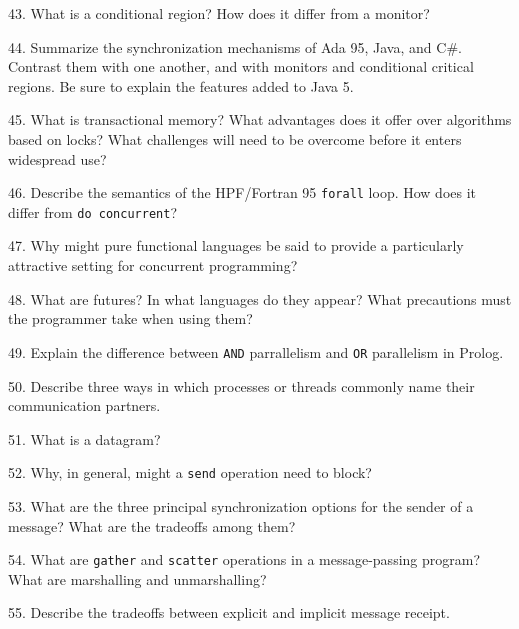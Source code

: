 43. What is a conditional region? How does it differ from a monitor?

\filbreak
\vskip 1cm

44. Summarize the synchronization mechanisms of Ada 95, Java, and C$\#$. Contrast them with one another, and with monitors and conditional critical regions. Be sure to explain the features added to Java 5.

\filbreak
\vskip 1cm

45. What is transactional memory? What advantages does it offer over algorithms based on locks? What challenges will need to be overcome before it enters widespread use?

\filbreak
\vskip 1cm

46. Describe the semantics of the HPF/Fortran 95 {\tt forall} loop. How does it differ from {\tt do concurrent}?

\filbreak
\vskip 1cm

47. Why might pure functional languages be said to provide a particularly attractive setting for concurrent programming?

\filbreak
\vskip 1cm

48. What are futures? In what languages do they appear? What precautions must the programmer take when using them?

\filbreak
\vskip 1cm

49. Explain the difference between {\tt AND} parrallelism and {\tt OR} parallelism in Prolog.

\filbreak
\vskip 1cm

50. Describe three ways in which processes or threads commonly name their communication partners.

\filbreak
\vskip 1cm

51. What is a datagram?

\filbreak
\vskip 1cm

52. Why, in general, might a {\tt send} operation need to block?

\filbreak
\vskip 1cm

53. What are the three principal synchronization options for the sender of a message? What are the tradeoffs among them?

\filbreak
\vskip 1cm

54. What are {\tt gather} and {\tt scatter} operations in a message-passing program? What are marshalling and unmarshalling?

\filbreak
\vskip 1cm

55. Describe the tradeoffs between explicit and implicit message receipt.

